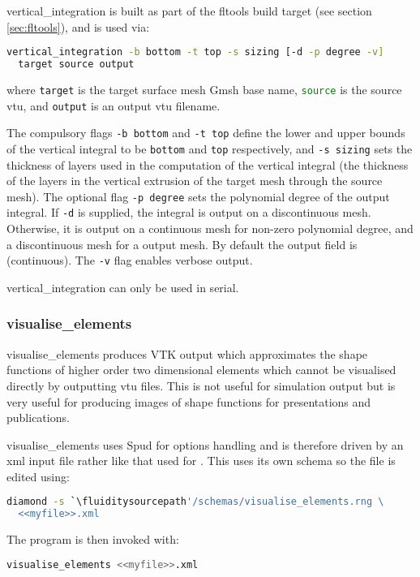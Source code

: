 vertical\_integration is built as part of the fltools build target (see section \ref{sec:fltools}),
and is used via:

\begin{lstlisting}[language = Bash]
vertical_integration -b bottom -t top -s sizing [-d -p degree -v]
  target source output
\end{lstlisting}

where \lstinline[language = Bash]+target+ is the target surface mesh Gmsh base name,
\lstinline[language = Bash]+source+ is the source vtu, and \lstinline[language = Bash]+output+
is an output vtu filename.

The compulsory flags \lstinline[language = Bash]+-b bottom+
and \lstinline[language = Bash]+-t top+ define the lower and upper bounds of
the vertical integral to be \lstinline[language = Bash]+bottom+ and \lstinline[language = Bash]+top+
respectively, and \lstinline[language = Bash]+-s sizing+ sets the thickness of layers
used in the computation of the vertical integral (the thickness of the layers in the
vertical extrusion of the target mesh through the source mesh). The optional
flag \lstinline[language = Bash]+-p degree+ sets the polynomial degree of the
output integral. If \lstinline[language = Bash]+-d+ is supplied, the integral
is output on a discontinuous mesh. Otherwise, it is output on a continuous
mesh for non-zero polynomial degree, and a discontinuous mesh for a \Pzero
output mesh. By default the output field is \Pone (continuous).
The \lstinline[language = Bash]+-v+ flag enables verbose output.

vertical\_integration can only be used in serial.


\subsubsection{visualise\_elements}
\label{sec:visualise_elements}

visualise\_elements produces VTK output which approximates the shape
functions of higher order two dimensional elements which cannot be
visualised directly by outputting vtu files. This is not useful for
simulation output but is very useful for producing images of shape functions
for presentations and publications.

visualise\_elements uses Spud for options handling and is therefore driven
by an xml input file rather like that used for \fluidity. This uses its own
schema so the file is edited using:
\begin{lstlisting}[language=Bash]
diamond -s `\fluiditysourcepath'/schemas/visualise_elements.rng \
  <<myfile>>.xml
\end{lstlisting}
The program is then invoked with:
\begin{lstlisting}[language=Bash]
visualise_elements <<myfile>>.xml
\end{lstlisting}

